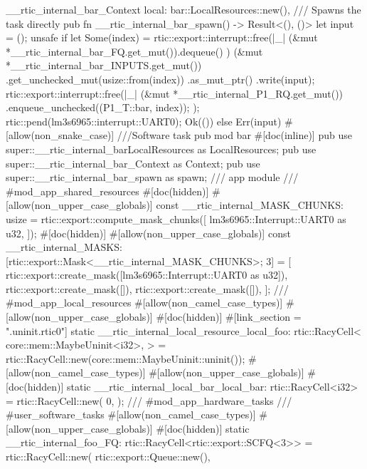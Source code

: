 {{{            __rtic_internal_bar_Context {
                local: bar::LocalResources::new(),
            }
        }
    }
    /// Spawns the task directly
    pub fn __rtic_internal_bar_spawn() -> Result<(), ()> {
        let input = ();
        unsafe {
            if let Some(index) = rtic::export::interrupt::free(|_| {
                (&mut *__rtic_internal_bar_FQ.get_mut()).dequeue()
            }) {
                (&mut *__rtic_internal_bar_INPUTS.get_mut())
                    .get_unchecked_mut(usize::from(index))
                    .as_mut_ptr()
                    .write(input);
                rtic::export::interrupt::free(|_| {
                    (&mut *__rtic_internal_P1_RQ.get_mut())
                        .enqueue_unchecked((P1_T::bar, index));
                });
                rtic::pend(lm3s6965::interrupt::UART0);
                Ok(())
            } else {
                Err(input)
            }
        }
    }
    #[allow(non_snake_case)]
    ///Software task
    pub mod bar {
        #[doc(inline)]
        pub use super::__rtic_internal_barLocalResources as LocalResources;
        pub use super::__rtic_internal_bar_Context as Context;
        pub use super::__rtic_internal_bar_spawn as spawn;
    }
    /// app module
    /// #mod_app_shared_resources
    #[doc(hidden)]
    #[allow(non_upper_case_globals)]
    const __rtic_internal_MASK_CHUNKS: usize = rtic::export::compute_mask_chunks([
        lm3s6965::Interrupt::UART0 as u32,
    ]);
    #[doc(hidden)]
    #[allow(non_upper_case_globals)]
    const __rtic_internal_MASKS: [rtic::export::Mask<__rtic_internal_MASK_CHUNKS>; 3] = [
        rtic::export::create_mask([lm3s6965::Interrupt::UART0 as u32]),
        rtic::export::create_mask([]),
        rtic::export::create_mask([]),
    ];
    /// #mod_app_local_resources
    #[allow(non_camel_case_types)]
    #[allow(non_upper_case_globals)]
    #[doc(hidden)]
    #[link_section = ".uninit.rtic0"]
    static __rtic_internal_local_resource_local_foo: rtic::RacyCell<
        core::mem::MaybeUninit<i32>,
    > = rtic::RacyCell::new(core::mem::MaybeUninit::uninit());
    #[allow(non_camel_case_types)]
    #[allow(non_upper_case_globals)]
    #[doc(hidden)]
    static __rtic_internal_local_bar_local_bar: rtic::RacyCell<i32> = rtic::RacyCell::new(
        0,
    );
    /// #mod_app_hardware_tasks
    /// #user_software_tasks
    #[allow(non_camel_case_types)]
    #[allow(non_upper_case_globals)]
    #[doc(hidden)]
    static __rtic_internal_foo_FQ: rtic::RacyCell<rtic::export::SCFQ<3>> = rtic::RacyCell::new(
        rtic::export::Queue::new(),
}
